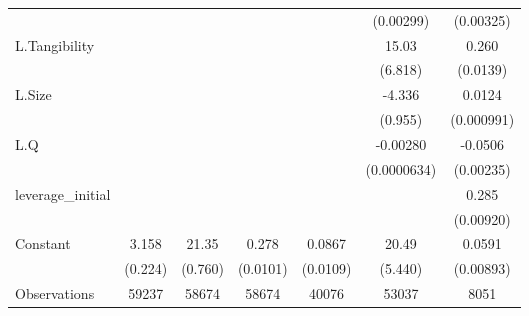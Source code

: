 {\begin{tabular}{l*{6}{c}}
                    &                     &                     &                     &                     &   (0.00299)         &   (0.00325)         \\
[1em]
L.Tangibility       &                     &                     &                     &                     &       15.03\sym{*}  &       0.260\sym{***}\\
                    &                     &                     &                     &                     &     (6.818)         &    (0.0139)         \\
[1em]
L.Size              &                     &                     &                     &                     &      -4.336\sym{***}&      0.0124\sym{***}\\
                    &                     &                     &                     &                     &     (0.955)         &  (0.000991)         \\
[1em]
L.Q                 &                     &                     &                     &                     &    -0.00280\sym{***}&     -0.0506\sym{***}\\
                    &                     &                     &                     &                     & (0.0000634)         &   (0.00235)         \\
[1em]
leverage\_initial    &                     &                     &                     &                     &                     &       0.285\sym{***}\\
                    &                     &                     &                     &                     &                     &   (0.00920)         \\
[1em]
Constant            &       3.158\sym{***}&       21.35\sym{***}&       0.278\sym{***}&      0.0867\sym{***}&       20.49\sym{***}&      0.0591\sym{***}\\
                    &     (0.224)         &     (0.760)         &    (0.0101)         &    (0.0109)         &     (5.440)         &   (0.00893)         \\
\hline
Observations        &       59237         &       58674         &       58674         &       40076         &       53037         &        8051         \\
\hline\hline
\end{tabular}
}
